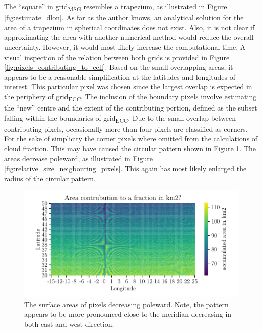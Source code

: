The ``square'' in grid\textsubscript{MSG} resembles a trapezium, as illustrated in Figure \ref{fig:estimate_dlon}. As far as the author knows, an analytical solution for the area of a trapezium in spherical coordinates does not exist. Also, it is not clear if approximating the area with another numerical method would reduce the overall uncertainty. However, it would most likely increase the computational time. 
A visual inspection of the relation between both grids is provided in 
Figure \ref{fig:pixels_contributing_to_cell}. Based on the small overlapping areas, it appears to be a reasonable simplification at the latitudes and longitudes of interest. This particular pixel was chosen since the largest overlap is expected in the periphery of grid\textsubscript{ECC}. The inclusion of the boundary pixels involve estimating the ``new'' centre and the extent of the contributing portion, defined as the subset falling within the boundaries of grid\textsubscript{ECC}. Due to the small overlap between contributing pixels, occasionally more than four pixels are classified as corners. For the sake of simplicity the corner pixels where omitted from the calculations of cloud fraction. This may have caused the circular pattern shown in Figure \ref{fig:area_pixel_signal}. The areas decrease poleward, as illustrated in Figure \ref{fig:relative_size_neigbouring_pixels}. This again has most likely enlarged the radius of the circular pattern.
\begin{figure}[ht]
    \centering
    \includegraphics{python_figs/signal_area_pixel.pdf}
    \caption{The surface areas of pixels decreasing poleward. Note, the pattern appears to be more pronounced close to the meridian decreasing in both east and west direction.}
    \label{fig:area_pixel_signal}
\end{figure} 



